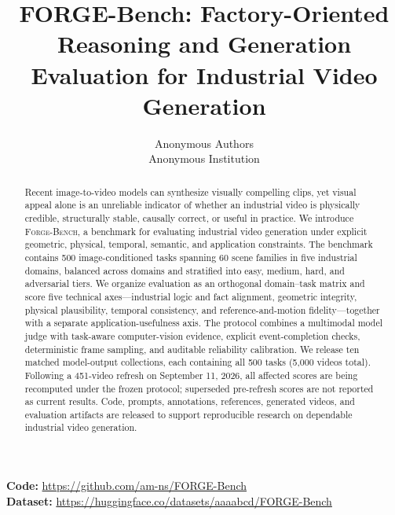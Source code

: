 \documentclass[11pt]{article}
\title{FORGE-Bench: Factory-Oriented Reasoning and Generation Evaluation for Industrial Video Generation}
\author{Anonymous Authors\\Anonymous Institution}
\date{}
\newcommand{\FORGE}{\textsc{Forge-Bench}}
\begin{document}
\maketitle

\begin{abstract}
Recent image-to-video models can synthesize visually compelling clips, yet visual appeal alone is an unreliable indicator of whether an industrial video is physically credible, structurally stable, causally correct, or useful in practice. We introduce \FORGE, a benchmark for evaluating industrial video generation under explicit geometric, physical, temporal, semantic, and application constraints. The benchmark contains 500 image-conditioned tasks spanning 60 scene families in five industrial domains, balanced across domains and stratified into easy, medium, hard, and adversarial tiers. We organize evaluation as an orthogonal domain--task matrix and score five technical axes---industrial logic and fact alignment, geometric integrity, physical plausibility, temporal consistency, and reference-and-motion fidelity---together with a separate application-usefulness axis. The protocol combines a multimodal model judge with task-aware computer-vision evidence, explicit event-completion checks, deterministic frame sampling, and auditable reliability calibration. We release ten matched model-output collections, each containing all 500 tasks (5,000 videos total). Following a 451-video refresh on September 11, 2026, all affected scores are being recomputed under the frozen protocol; superseded pre-refresh scores are not reported as current results. Code, prompts, annotations, references, generated videos, and evaluation artifacts are released to support reproducible research on dependable industrial video generation.
\end{abstract}

\noindent\textbf{Code:} \url{https://github.com/am-ns/FORGE-Bench}\\
\textbf{Dataset:} \url{https://huggingface.co/datasets/aaaabcd/FORGE-Bench}













\clearpage
\appendix

\end{document}
